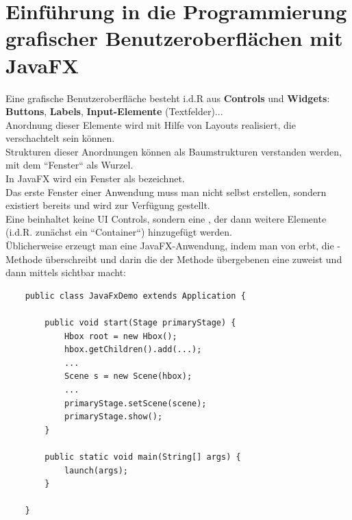 \section{Einführung in die Programmierung grafischer Benutzeroberflächen mit JavaFX}


Eine grafische Benutzeroberfläche besteht i.d.R aus \textbf{Controls} und \textbf{Widgets}: \textbf{Buttons}, \textbf{Labels}, \textbf{Input-Elemente} (Textfelder)...\\

\noindent
Anordnung dieser Elemente wird mit Hilfe von Layouts realisiert, die verschachtelt sein können.\\

\noindent
Strukturen dieser Anordnungen können als Baumstrukturen verstanden werden, mit dem ``Fenster`` als Wurzel.\\

\noindent
In JavaFX wird ein Fenster als  bezeichnet.\\

\noindent
Das erste Fenster einer Anwendung muss man nicht selbst erstellen, sondern existiert bereits und wird zur Verfügung gestellt.\\

\noindent
Eine  beinhaltet keine UI Controls, sondern eine , der dann weitere Elemente (i.d.R. zunächst ein ``Container``) hinzugefügt werden.\\

\noindent
Üblicherweise erzeugt man eine JavaFX-Anwendung, indem man von  erbt, die -Methode überschreibt und darin die der Methode übergebenen  eine  zuweist und dann mittels  sichtbar macht:

\begin{verbatim}
    public class JavaFxDemo extends Application {

        public void start(Stage primaryStage) {
            Hbox root = new Hbox();
            hbox.getChildren().add(...);
            ...
            Scene s = new Scene(hbox);
            ...
            primaryStage.setScene(scene);
            primaryStage.show();
        }

        public static void main(String[] args) {
            launch(args);
        }

    }
\end{verbatim}\\

